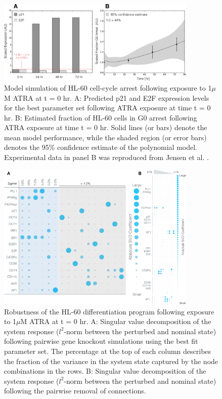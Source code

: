\documentclass[12pt]{article}
\begin{document}
\begin{figure}[!t]\centering
\includegraphics[width=0.85\textwidth]{./figs/Fig-5-GRN-CellCycle-Predictions.pdf}
\caption{Model simulation of HL-60 cell-cycle arrest following exposure to 1$\mu$M ATRA at t = 0 hr.
A: Predicted p21 and E2F expression levels for the best parameter set following ATRA exposure at time t = 0 hr.
B: Estimated fraction of HL-60 cells in G0 arrest following ATRA exposure at time t = 0 hr.
Solid lines (or bars) denote the mean model performance, while the shaded region (or error bars) denotes the 95\% confidence estimate of the polynomial model.
Experimental data in panel B was reproduced from Jensen et al. \cite{Jensen:2015aa}.}\label{fig:model-cell-cycle-simulations}
\end{figure}

\begin{figure}[!t]\centering
\includegraphics[width=0.85\textwidth]{./figs/Fig-6-GRN-Robustness.pdf}
\caption{Robustness of the HL-60 differentiation program following exposure to 1$\mu$M ATRA at t = 0 hr.
A: Singular value decomposition of the system response ($l^{2}$-norm between the perturbed and nominal state) following pairwise gene knockout simulations using the best fit parameter set.
The percentage at the top of each column describes the fraction of the variance in the system state captured by the node combinations in the rows.
B: Singular value decomposition of the system response ($l^{2}$-norm between the perturbed and nominal state) following the pairwise removal of connections.}\label{fig:model-response-ko}
\end{figure}
\end{document}
